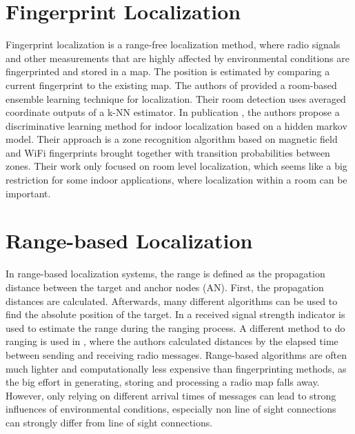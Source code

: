 \section{Fingerprint Localization}
Fingerprint localization is a range-free localization method, where radio signals and other measurements that are highly affected by environmental conditions are fingerprinted and stored in a map. The position is estimated by comparing a current fingerprint to the existing map. The authors of \cite{Taniuchi} provided a room-based ensemble learning technique for localization. Their room detection uses averaged coordinate outputs of a k-NN estimator. In publication \cite{Carrera2}, the authors propose a discriminative learning method for indoor localization based on a hidden markov model. Their approach is a zone recognition algorithm based on magnetic field and WiFi fingerprints brought together with transition probabilities between zones. Their work only focused on room level localization, which seems like a big restriction for some indoor applications, where localization within a room can be important.

\section{Range-based Localization}
In range-based localization systems, the range is defined as the propagation distance between the target and anchor nodes (AN). First, the propagation distances are calculated. Afterwards, many different algorithms can be used to find the absolute position of the target. In \cite{Horus} a received signal strength indicator is used to estimate the range during the ranging process. A different method to do ranging is used in \cite{IEEE}, where the authors calculated distances by the elapsed time between sending and receiving radio messages. Range-based algorithms are often much lighter and computationally less expensive than fingerprinting methods, as the big effort in generating, storing and processing a radio map falls away. However, only relying on different arrival times of messages can lead to strong influences of environmental conditions, especially non line of sight connections can strongly differ from line of sight connections.


